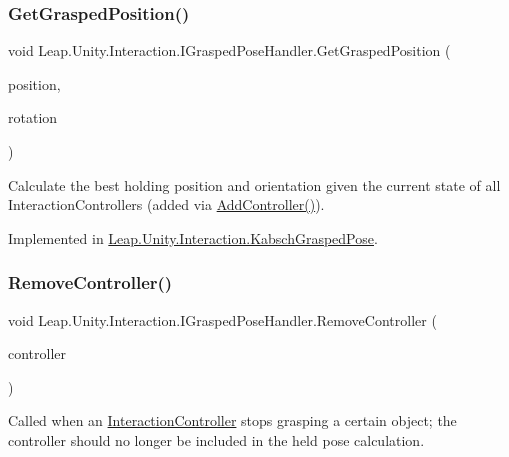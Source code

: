 \subsubsection{\texorpdfstring{GetGraspedPosition()}{GetGraspedPosition()}}
{\footnotesize\ttfamily void Leap.\+Unity.\+Interaction.\+I\+Grasped\+Pose\+Handler.\+Get\+Grasped\+Position (\begin{DoxyParamCaption}\item[{out Vector3}]{position,  }\item[{out Quaternion}]{rotation }\end{DoxyParamCaption})}



Calculate the best holding position and orientation given the current state of all Interaction\+Controllers (added via \mbox{\hyperlink{interface_leap_1_1_unity_1_1_interaction_1_1_i_grasped_pose_handler_ad6b297cf90c878a95ca69901180ab4ce}{Add\+Controller()}}). 



Implemented in \mbox{\hyperlink{class_leap_1_1_unity_1_1_interaction_1_1_kabsch_grasped_pose_ad691816b67d028dfc7c69e9c782c6eef}{Leap.\+Unity.\+Interaction.\+Kabsch\+Grasped\+Pose}}.

\mbox{\label{interface_leap_1_1_unity_1_1_interaction_1_1_i_grasped_pose_handler_a7e7305b0089610eced1ee4ca98c3d586}} 
\subsubsection{\texorpdfstring{RemoveController()}{RemoveController()}}
{\footnotesize\ttfamily void Leap.\+Unity.\+Interaction.\+I\+Grasped\+Pose\+Handler.\+Remove\+Controller (\begin{DoxyParamCaption}\item[{\mbox{\hyperlink{class_leap_1_1_unity_1_1_interaction_1_1_interaction_controller}{Interaction\+Controller}}}]{controller }\end{DoxyParamCaption})}



Called when an \mbox{\hyperlink{class_leap_1_1_unity_1_1_interaction_1_1_interaction_controller}{Interaction\+Controller}} stops grasping a certain object; the controller should no longer be included in the held pose calculation. 



